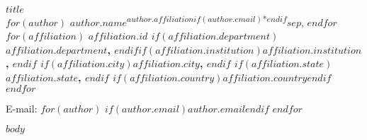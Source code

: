 \documentclass{frontiersSCNS} %
\begin{document}
\begin{flushleft}
{\Large
\textbf{$title$}
}
\\
$for(author)$
  $author.name$\textsuperscript{$author.affiliation$$if(author.email)$*$endif$}$sep$,
$endfor$
\\
$for(affiliation)$
\bf{$affiliation.id$} $if(affiliation.department)$$affiliation.department$, $endif$$if(affiliation.institution)$$affiliation.institution$, $endif$ $if(affiliation.city)$$affiliation.city$, $endif$ $if(affiliation.state)$$affiliation.state$, $endif$ $if(affiliation.country)$$affiliation.country$$endif$
\\
$endfor$

\textasteriskcentered{} E-mail: $for(author)$
  $if(author.email)$$author.email$$endif$
$endfor$

\end{flushleft}

$body$



\end{document}
